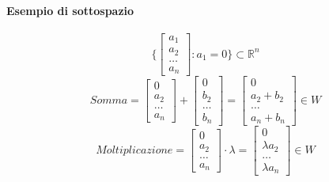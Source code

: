 \documentclass[12pt,a4paper]{article}
\begin{document}
\paragraph{Esempio di sottospazio}
\[
\{\begin{bmatrix}
  a_1\\
  a_2\\
  \ldots\\
  a_n
\end{bmatrix}
: a_1 = 0\} \subset \mathbb{R}^n
\]
\[
Somma = \begin{bmatrix}
  0\\
  a_2\\
  \ldots\\
  a_n
\end{bmatrix} + \begin{bmatrix}
  0\\
  b_2\\
  \ldots\\
  b_n
\end{bmatrix} = \begin{bmatrix}
  0\\
  a_2 + b_2\\
  \ldots\\
  a_n + b_n
\end{bmatrix} \in W
\]
\[
Moltiplicazione = \begin{bmatrix}
  0\\
  a_2\\
  \ldots\\
  a_n
\end{bmatrix} \cdot \lambda = \begin{bmatrix}
  0\\
  \lambda a_2\\
  \ldots\\
  \lambda a_n
\end{bmatrix} \in W
\]
\end{document}
